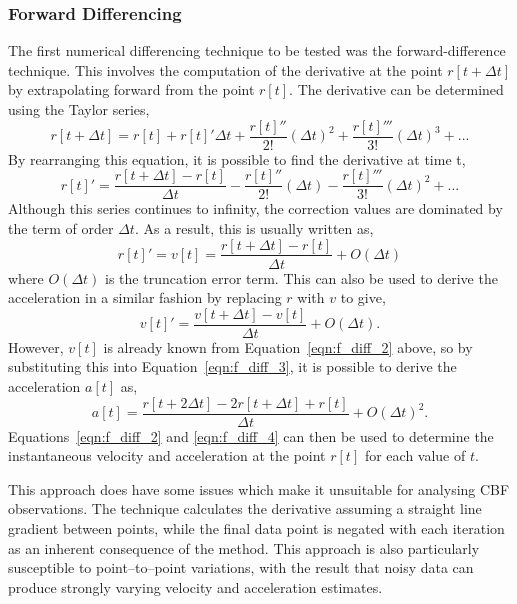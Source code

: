 \subsubsection{Forward Differencing}
\label{subsubsect:f_diff}

The first numerical differencing technique to be tested was the forward-difference technique. This involves the computation of the derivative at the point $r[t + \Delta t]$ by extrapolating forward from the point $r[t]$. The derivative can be determined using the Taylor series,
\begin{equation}
r[t + \Delta t] = r[t] + r[t]'\Delta t +  \frac{r[t]''}{2!}(\Delta t)^{2} + \frac{r[t]'''}{3!}(\Delta t)^{3}  + ... \label{eqn:f_diff_0}
\end{equation}
By rearranging this equation, it is possible to find the derivative at time t, 
\begin{equation}
r[t]' = \frac{r[t + \Delta t] - r[t]}{\Delta t} -  \frac{r[t]''}{2!}(\Delta t) - \frac{r[t]'''}{3!}(\Delta t)^{2}  + ... \label{eqn:f_diff_1}
\end{equation}
Although this series continues to infinity, the correction values are dominated by the term of order $\Delta t$. As a result, this is usually written as,
\begin{equation}
r[t]' = v[t] = \frac{r[t + \Delta t] - r[t]}{\Delta t} + O(\Delta t) \label{eqn:f_diff_2}
\end{equation}
where $O(\Delta t)$ is the truncation error term. This can also be used to derive the acceleration in a similar fashion by replacing $r$ with $v$ to give,
\begin{equation}
v[t]' = \frac{v[t + \Delta t] - v[t]}{\Delta t} + O(\Delta t). \label{eqn:f_diff_3}
\end{equation}
However, $v[t]$ is already known from Equation~\ref{eqn:f_diff_2} above, so by substituting this into Equation~\ref{eqn:f_diff_3}, it is possible to derive the acceleration $a[t]$ as,
\begin{equation}
a[t] = \frac{r[t + 2\Delta t] - 2r[t+\Delta t] + r[t]}{\Delta t} + O(\Delta t)^2 . \label{eqn:f_diff_4}
\end{equation}
Equations~\ref{eqn:f_diff_2} and \ref{eqn:f_diff_4} can then be used to determine the instantaneous velocity and acceleration at the point $r[t]$ for each value of $t$. 

This approach does have some issues which make it unsuitable for analysing CBF observations. The technique calculates the derivative assuming a straight line gradient between points, while the final data point is negated with each iteration as an inherent consequence of the method. This approach is also particularly susceptible to point--to--point variations, with the result that noisy data can produce strongly varying velocity and acceleration estimates.

